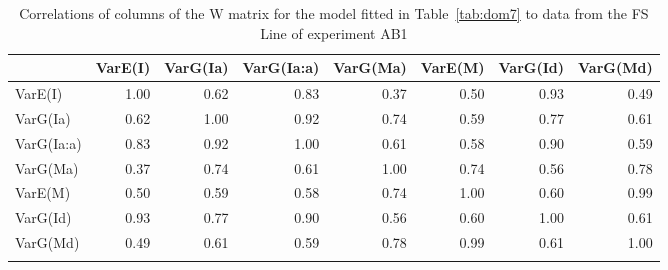 \begin{table}[ht]
\scriptsize
\centering
\caption{Correlations of columns of the W matrix for the model fitted in Table~\ref{tab:dom7} to data from the FS Line of experiment AB1}
\label{tab:corrdom}
\begin{tabular}{lrrrrrrr}
  \hline
 & VarE(I) & VarG(Ia) & VarG(Ia:a) & VarG(Ma) & VarE(M) & VarG(Id) & VarG(Md) \\ 
  \hline
VarE(I) & 1.00 & 0.62 & 0.83 & 0.37 & 0.50 & 0.93 & 0.49 \\ 
  VarG(Ia) & 0.62 & 1.00 & 0.92 & 0.74 & 0.59 & 0.77 & 0.61 \\ 
  VarG(Ia:a) & 0.83 & 0.92 & 1.00 & 0.61 & 0.58 & 0.90 & 0.59 \\ 
  VarG(Ma) & 0.37 & 0.74 & 0.61 & 1.00 & 0.74 & 0.56 & 0.78 \\ 
  VarE(M) & 0.50 & 0.59 & 0.58 & 0.74 & 1.00 & 0.60 & 0.99 \\ 
  VarG(Id) & 0.93 & 0.77 & 0.90 & 0.56 & 0.60 & 1.00 & 0.61 \\ 
  VarG(Md) & 0.49 & 0.61 & 0.59 & 0.78 & 0.99 & 0.61 & 1.00 \\ 
   \hline
\normalsize
\end{tabular}
\end{table}


